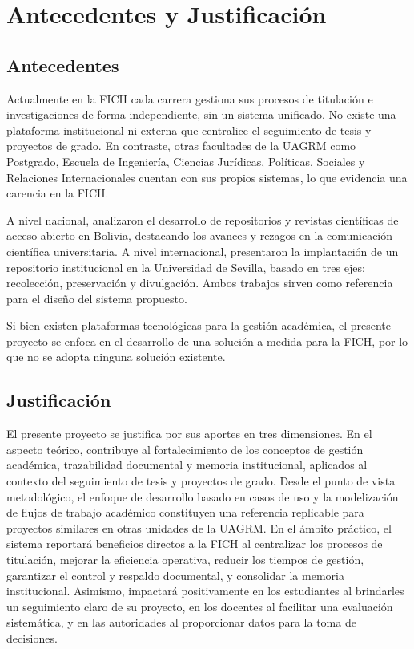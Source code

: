 \section{Antecedentes y Justificación}
\label{sec:antecedentes}

\subsection{Antecedentes}

Actualmente en la FICH cada carrera gestiona sus procesos de titulación e investigaciones de forma independiente, sin un sistema unificado. No existe una plataforma institucional ni externa que centralice el seguimiento de tesis y proyectos de grado. En contraste, otras facultades de la UAGRM como Postgrado, Escuela de Ingeniería, Ciencias Jurídicas, Políticas, Sociales y Relaciones Internacionales cuentan con sus propios sistemas, lo que evidencia una carencia en la FICH.

A nivel nacional, \textcite{perales2022repositorios} analizaron el desarrollo de repositorios y revistas científicas de acceso abierto en Bolivia, destacando los avances y rezagos en la comunicación científica universitaria. A nivel internacional, \textcite{leon2012implantacion} presentaron la implantación de un repositorio institucional en la Universidad de Sevilla, basado en tres ejes: recolección, preservación y divulgación. Ambos trabajos sirven como referencia para el diseño del sistema propuesto.

Si bien existen plataformas tecnológicas para la gestión académica, el presente proyecto se enfoca en el desarrollo de una solución a medida para la FICH, por lo que no se adopta ninguna solución existente.

\subsection{Justificación}

El presente proyecto se justifica por sus aportes en tres dimensiones. En el aspecto teórico, contribuye al fortalecimiento de los conceptos de gestión académica, trazabilidad documental y memoria institucional, aplicados al contexto del seguimiento de tesis y proyectos de grado. Desde el punto de vista metodológico, el enfoque de desarrollo basado en casos de uso y la modelización de flujos de trabajo académico constituyen una referencia replicable para proyectos similares en otras unidades de la UAGRM. En el ámbito práctico, el sistema reportará beneficios directos a la FICH al centralizar los procesos de titulación, mejorar la eficiencia operativa, reducir los tiempos de gestión, garantizar el control y respaldo documental, y consolidar la memoria institucional. Asimismo, impactará positivamente en los estudiantes al brindarles un seguimiento claro de su proyecto, en los docentes al facilitar una evaluación sistemática, y en las autoridades al proporcionar datos para la toma de decisiones.

\endinput

